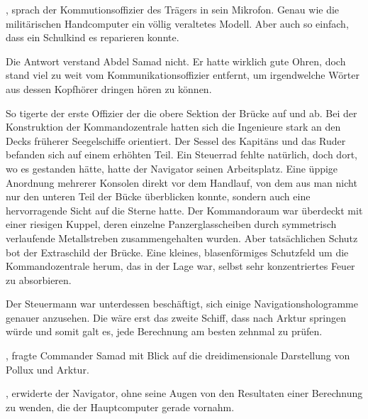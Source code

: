 , sprach der Kommutionsoffizier des Trägers in sein Mikrofon.
Genau wie die militärischen Handcomputer ein völlig veraltetes Modell.
Aber auch so einfach, dass ein Schulkind es reparieren konnte.

\par

Die Antwort verstand Abdel Samad nicht.
Er hatte wirklich gute Ohren, doch stand viel zu weit vom Kommunikationsoffizier entfernt, um irgendwelche Wörter aus dessen Kopfhörer dringen hören zu können.

\par

So tigerte der erste Offizier der  die obere Sektion der Brücke auf und ab.
Bei der Konstruktion der Kommandozentrale hatten sich die Ingenieure stark an den Decks früherer Seegelschiffe orientiert.
Der Sessel des Kapitäns und das Ruder befanden sich auf einem erhöhten Teil.
Ein Steuerrad fehlte natürlich, doch dort, wo es gestanden hätte, hatte der Navigator seinen Arbeitsplatz.
Eine üppige Anordnung mehrerer Konsolen direkt vor dem Handlauf, von dem aus man nicht nur den unteren Teil der Bücke überblicken konnte, sondern auch eine hervorragende Sicht auf die Sterne hatte.
Der Kommandoraum war überdeckt mit einer riesigen Kuppel, deren einzelne Panzerglasscheiben durch symmetrisch verlaufende Metallstreben zusammengehalten wurden.
Aber tatsächlichen Schutz bot der Extraschild der Brücke.
Eine kleines, blasenförmiges Schutzfeld um die Kommandozentrale herum, das in der Lage war, selbst sehr konzentriertes Feuer zu absorbieren.

\par

Der Steuermann war unterdessen beschäftigt, sich einige Navigationshologramme genauer anzusehen.
Die  wäre erst das zweite Schiff, dass nach Arktur springen würde und somit galt es, jede Berechnung am besten zehnmal zu prüfen.

\par

, fragte Commander Samad mit Blick auf die dreidimensionale Darstellung von Pollux und Arktur.

\par

, erwiderte der Navigator, ohne seine Augen von den Resultaten einer Berechnung zu wenden, die der Hauptcomputer gerade vornahm.

